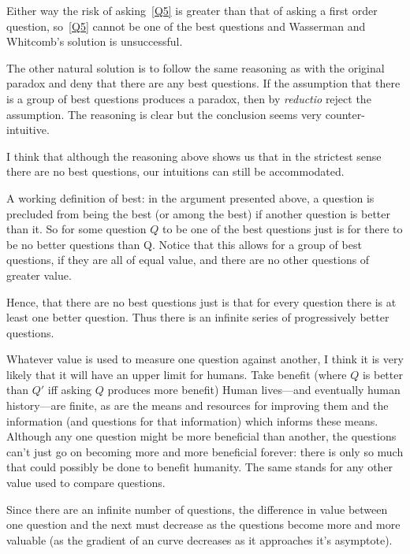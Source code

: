 Either way the risk of asking~\ref{Q5} is greater than that of asking a first order question, so~\ref{Q5} cannot be one of the best questions and Wasserman and Whitcomb's solution is unsuccessful.

The other natural solution is to follow the same reasoning as with the original paradox and deny that there are any best questions.
If the assumption that there is a group of best questions produces a paradox, then by \textit{reductio} reject the assumption.
The reasoning is clear but the conclusion seems very counter-intuitive.

I think that although the reasoning above shows us that in the strictest sense there are no best questions, our intuitions can still be accommodated.

A working definition of best: in the argument presented above, a question is precluded from being the best (or among the best) if another question is better than it.
So for some question $Q$ to be one of the best questions just is for there to be no better questions than Q.
Notice that this allows for a group of best questions, if they are all of equal value, and there are no other questions of greater value.

Hence, that there are no best questions just is that for every question there is at least one better question.
Thus there is an infinite series of progressively better questions.

Whatever value is used to measure one question against another, I think it is very likely that it will have an upper limit for humans.
Take benefit (where $Q$ is better than $Q'$ iff asking $Q$ produces more benefit)
Human lives---and eventually human history---are finite, as are the means and resources for improving them and the information (and questions for that information) which informs these means.
Although any one question might be more beneficial than another, the questions can't just go on becoming more and more beneficial forever: there is only so much that could possibly be done to benefit humanity.
The same stands for any other value used to compare questions.

Since there are an infinite number of questions, the difference in value between one question and the next must decrease as the questions become more and more valuable (as the gradient of an curve decreases as it approaches it's asymptote).

